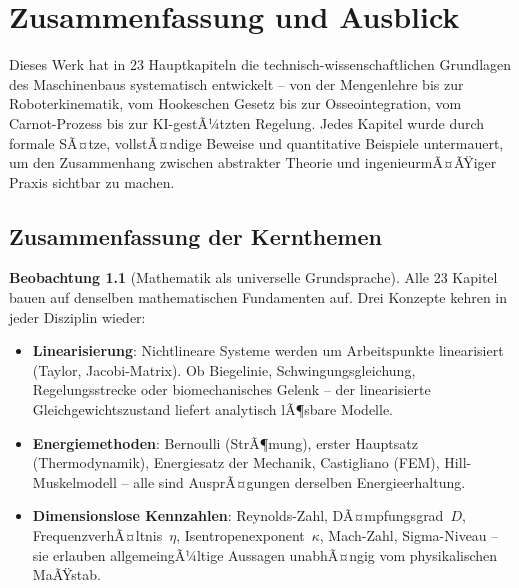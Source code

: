 ﻿\documentclass[a4paper,12pt]{report}
\theoremstyle{definition}
\newtheorem{beobachtung}{Beobachtung}
\begin{document}
\chapter{Zusammenfassung und Ausblick}

Dieses Werk hat in 23 Hauptkapiteln die technisch-wissenschaftlichen
Grundlagen des Maschinenbaus systematisch entwickelt -- von der
Mengenlehre bis zur Roboterkinematik, vom Hookeschen Gesetz bis zur
Osseointegration, vom Carnot-Prozess bis zur KI-gestÃ¼tzten Regelung.
Jedes Kapitel wurde durch formale SÃ¤tze, vollstÃ¤ndige Beweise und
quantitative Beispiele untermauert, um den Zusammenhang zwischen
abstrakter Theorie und ingenieurmÃ¤ÃŸiger Praxis sichtbar zu machen.

\section{Zusammenfassung der Kernthemen}

\begin{beobachtung}[Mathematik als universelle Grundsprache]
Alle 23 Kapitel bauen auf denselben mathematischen Fundamenten auf.
Drei Konzepte kehren in jeder Disziplin wieder:
\begin{itemize}
    \item[-] \textbf{Linearisierung}: Nichtlineare Systeme werden um
          Arbeitspunkte linearisiert (Taylor, Jacobi-Matrix).
          Ob Biegelinie, Schwingungsgleichung, Regelungsstrecke oder
          biomechanisches Gelenk -- der linearisierte Gleichgewichtszustand
          liefert analytisch lÃ¶sbare Modelle.
    \item[-] \textbf{Energiemethoden}: Bernoulli (StrÃ¶mung), erster Hauptsatz
          (Thermodynamik), Energiesatz der Mechanik, Castigliano (FEM),
          Hill-Muskelmodell -- alle sind AusprÃ¤gungen derselben Energieerhaltung.
    \item[-] \textbf{Dimensionslose Kennzahlen}: Reynolds-Zahl, DÃ¤mpfungsgrad~$D$,
          FrequenzverhÃ¤ltnis~$\eta$, Isentropenexponent~$\kappa$, Mach-Zahl,
          Sigma-Niveau -- sie erlauben allgemeingÃ¼ltige Aussagen unabhÃ¤ngig
          vom physikalischen MaÃŸstab.
\end{itemize}
\end{beobachtung}
\end{document}
